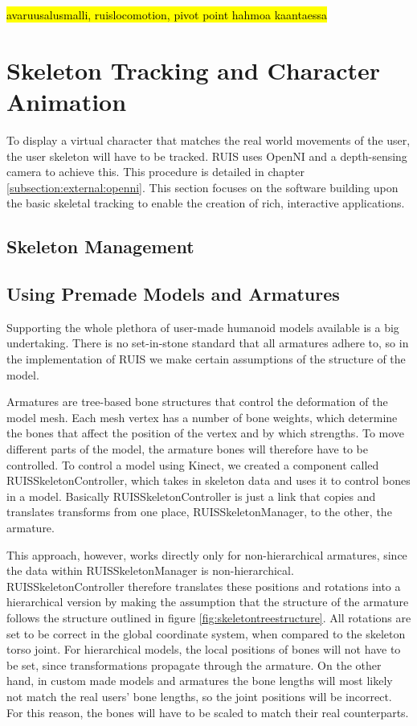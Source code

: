 \documentclass[12pt,a4paper,oneside,pdftex]{report}
\begin{document}
\hl{avaruusalusmalli, ruislocomotion, pivot point hahmoa kaantaessa}

\section{Skeleton Tracking and Character Animation}
\label{section:skeletontracking}

To display a virtual character that matches the real world movements of the user, the user skeleton will have to be tracked. RUIS uses OpenNI and a depth-sensing camera to achieve this. This procedure is detailed in chapter \ref{subsection:external:openni}. This section focuses on the software building upon the basic skeletal tracking to enable the creation of rich, interactive applications. 

\subsection{Skeleton Management}
\label{subsection:skeletontracking:skeletonmanagement}

\subsection{Using Premade Models and Armatures}
\label{subsection:skeletontracking:premademodels}

Supporting the whole plethora of user-made humanoid models available is a big undertaking. There is no set-in-stone standard that all armatures adhere to, so in the implementation of RUIS we make certain assumptions of the structure of the model.

Armatures are tree-based bone structures that control the deformation of the model mesh. Each mesh vertex has a number of bone weights, which determine the bones that affect the position of the vertex and by which strengths. To move different parts of the model, the armature bones will therefore have to be controlled. To control a model using Kinect, we created a component called RUISSkeletonController, which takes in skeleton data and uses it to control bones in a model. Basically RUISSkeletonController is just a link that copies and translates transforms from one place, RUISSkeletonManager, to the other, the armature.

This approach, however, works directly only for non-hierarchical armatures, since the data within RUISSkeletonManager is non-hierarchical. RUISSkeletonController therefore translates these positions and rotations into a hierarchical version by making the assumption that the structure of the armature follows the structure outlined in figure \ref{fig:skeletontreestructure}. All rotations are set to be correct in the global coordinate system, when compared to the skeleton torso joint. For hierarchical models, the local positions of bones will not have to be set, since transformations propagate through the armature. On the other hand, in custom made models and armatures the bone lengths will most likely not match the real users' bone lengths, so the joint positions will be incorrect. For this reason, the bones will have to be scaled to match their real counterparts.
\end{document}
